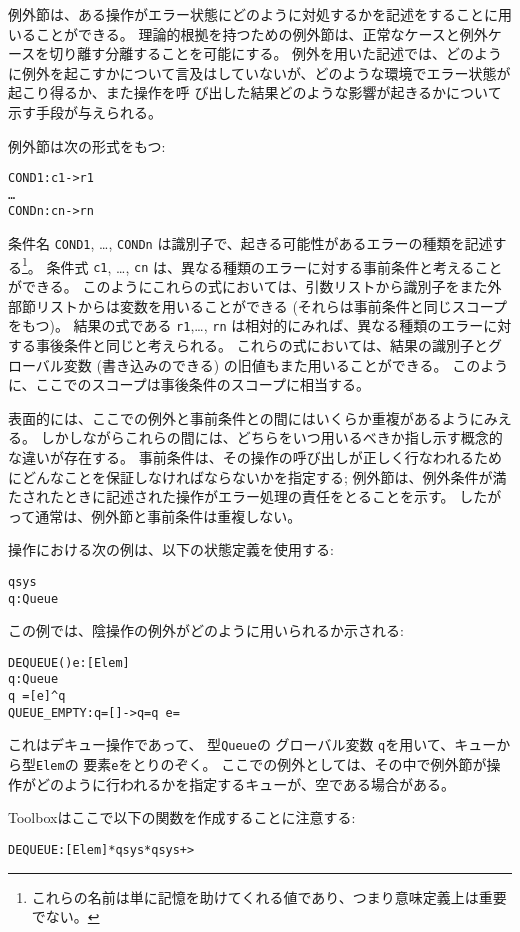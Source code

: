 \documentclass[\pformat,12pt]{jarticle}
\begin{document}
\begin{description}
\vspace{2ex}


例外節は、ある操作がエラー状態にどのように対処するかを記述をすることに用いることができる。
理論的根拠を持つための例外節は、正常なケースと例外ケースを切り離す分離することを可能にする。
例外を用いた記述では、どのように例外を起こすかについて言及はしていないが、どのような環境でエラー状態が起こり得るか、また操作を呼
び出した結果どのような影響が起きるかについて示す手段が与えられる。

例外節は次の形式をもつ:
\begin{alltt}
    COND1: c1 -> r1
       \ldots
       CONDn: cn -> rn
\end{alltt}
条件名 {\tt COND1}, \ldots, {\tt CONDn} は識別子で、起きる可能性があるエラーの種類を記述する\footnote{これらの名前は単に記憶を助けてくれる値であり、つまり意味定義上は重要でない。}。 
条件式 {\tt c1}, \ldots, {\tt cn} は、異なる種類のエラーに対する事前条件と考えることができる。
このようにこれらの式においては、引数リストから識別子をまた外部節リストからは変数を用いることができる (それらは事前条件と同じスコープをもつ)。
結果の式である {\tt r1},\ldots, {\tt rn} は相対的にみれば、異なる種類のエラーに対する事後条件と同じと考えられる。
これらの式においては、結果の識別子とグローバル変数 (書き込みのできる) の旧値もまた用いることができる。
このように、ここでのスコープは事後条件のスコープに相当する。

表面的には、ここでの例外と事前条件との間にはいくらか重複があるようにみえる。
しかしながらこれらの間には、どちらをいつ用いるべきか指し示す概念的な違いが存在する。 
事前条件は、その操作の呼び出しが正しく行なわれるためにどんなことを保証しなければならないかを指定する; 例外節は、例外条件が満たされたときに記述された操作がエラー処理の責任をとることを示す。
したがって通常は、例外節と事前条件は重複しない。

操作における次の例は、以下の状態定義を使用する:
\begin{alltt}
   qsys 
    q : Queue
\end{alltt}    
この例では、陰操作の例外がどのように用いられるか示される:
\begin{alltt}
  DEQUEUE() e: [Elem]
    q : Queue
   q~ = [e] ^ q
   QUEUE_EMPTY: q = [] -> q = q~  e = 
\end{alltt}

これはデキュー操作であって、 型{\tt Queue}の グローバル変数 {\tt q}を用いて、キューから型{\tt Elem}の 要素{\tt e}をとりのぞく。 
ここでの例外としては、その中で例外節が操作がどのように行われるかを指定するキューが、空である場合がある。

Toolboxはここで以下の関数を作成することに注意する:
\begin{alltt}
  DEQUEUE: [Elem] * qsys * qsys +> 
\end{alltt}


\end{description}
\end{document}
